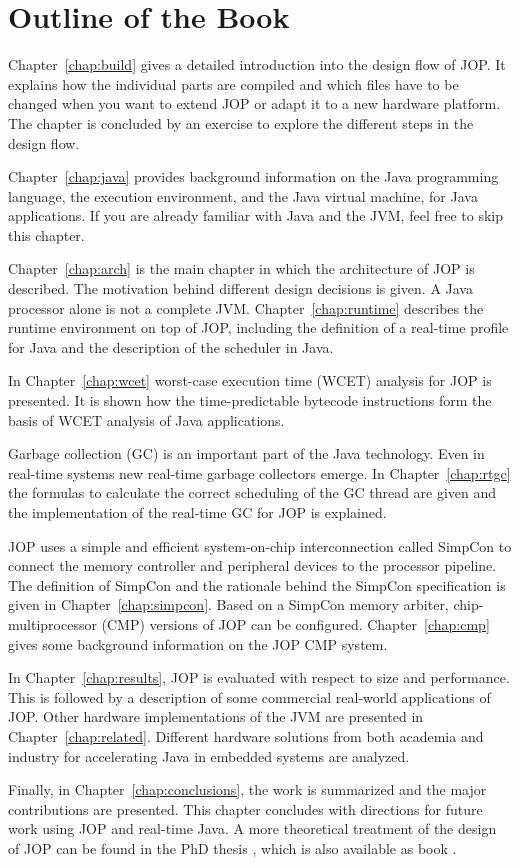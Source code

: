 \section{Outline of the Book}

Chapter~\ref{chap:build} gives a detailed introduction into the
design flow of JOP. It explains how the individual parts are compiled
and which files have to be changed when you want to extend JOP or
adapt it to a new hardware platform. The chapter is concluded by an
exercise to explore the different steps in the design flow.

Chapter~\ref{chap:java} provides background information on the Java
programming language, the execution environment, and the Java virtual
machine, for Java applications. If you are already familiar with Java
and the JVM, feel free to skip this chapter.

Chapter~\ref{chap:arch} is the main chapter in which the architecture
of JOP is described. The motivation behind different design decisions
is given. A Java processor alone is not a complete JVM.
Chapter~\ref{chap:runtime} describes the runtime environment on top
of JOP, including the definition of a real-time profile for Java and
the description of the scheduler in Java.

In Chapter~\ref{chap:wcet} worst-case execution time (WCET) analysis
for JOP is presented. It is shown how the time-predictable bytecode
instructions form the basis of WCET analysis of Java applications.

Garbage collection (GC) is an important part of the Java technology.
Even in real-time systems new real-time garbage collectors emerge. In
Chapter~\ref{chap:rtgc} the formulas to calculate the correct
scheduling of the GC thread are given and the implementation of the
real-time GC for JOP is explained.

JOP uses a simple and efficient system-on-chip interconnection called
SimpCon to connect the memory controller and peripheral devices to
the processor pipeline. The definition of SimpCon and the rationale
behind the SimpCon specification is given in
Chapter~\ref{chap:simpcon}. Based on a SimpCon memory arbiter,
chip-multiprocessor (CMP) versions of JOP can be configured.
Chapter~\ref{chap:cmp} gives some background information on the JOP
CMP system.


In Chapter~\ref{chap:results}, JOP is evaluated with respect to size
and performance. This is followed by a description of some commercial
real-world applications of JOP. Other hardware implementations of the
JVM are presented in Chapter~\ref{chap:related}. Different hardware
solutions from both academia and industry for accelerating Java in
embedded systems are analyzed.

Finally, in Chapter~\ref{chap:conclusions}, the work is summarized
and the major contributions are presented. This chapter concludes
with directions for future work using JOP and real-time Java. A more
theoretical treatment of the design of JOP can be found in the PhD
thesis \cite{jop:thesis}, which is also available as book
\cite{jop:thesis:book}.
